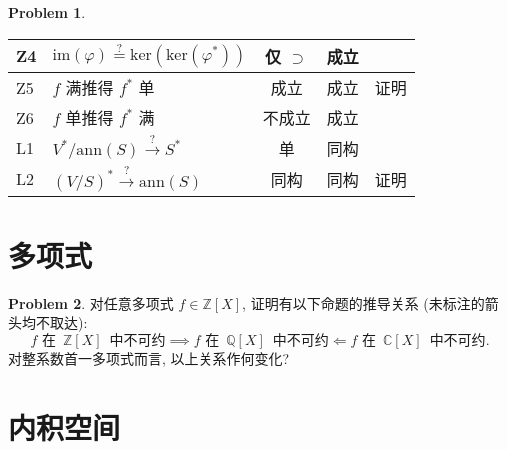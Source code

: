 \documentclass{MainStyle}
\theoremstyle{definition}
\newtheorem{problem}{Problem}
\begin{document}
\begin{problem}
\begin{center}
\begin{tabular}{||l|l|c|c|c||}
        \hline
        Z4   & $\mathrm{im}(\varphi)\overset ?=\mathrm{ker}(\mathrm{ker}(\varphi^\ast))$         & 仅 $\supset$ & 成立         &      \\
        \hline
        Z5   & $f$ 满推得 $f^\ast$ 单                                                            & 成立         & 成立         & 证明 \\
        \hline
        Z6   & $f$ 单推得 $f^\ast$ 满                                                            & 不成立       & 成立         &      \\
        \hline
        L1   & $V^\ast /\mathrm{ann}(S) \overset ?\to S^\ast$                                    & 单           & 同构         &      \\
        \hline
        L2   & $(V/S)^\ast\overset ?\to \mathrm{ann}(S)$                                         & 同构         & 同构         & 证明 \\ [1ex]
        \hline
    \end{tabular}
\end{center}
\vspace{6mm}
\end{problem}

\newpage

\section{多项式}

\begin{problem}
对任意多项式 $f\in \mathbb Z[X]$, 证明有以下命题的推导关系 (未标注的箭头均不取达):
\begin{equation}
    f\text{ 在 }\,\mathbb Z[X]\,\text{ 中不可约}\implies f\text{ 在 }\,\mathbb Q[X]\,\text{ 中不可约}\Longleftarrow f\text{ 在 }\,\mathbb C[X]\,\text{ 中不可约}.
\end{equation}
对整系数首一多项式而言, 以上关系作何变化?
\end{problem}

\newpage

\section{内积空间}
\end{document}
